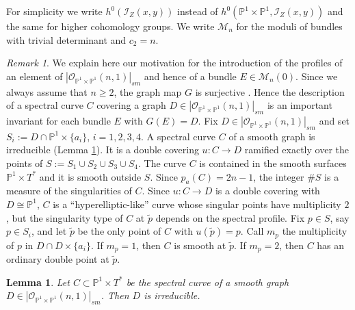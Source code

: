 \documentclass[
  a4paper, 
  reqno, 
  oneside, 
  11pt
]{amsart}
\theoremstyle{plain}	%
\newtheorem{lemma}{Lemma}
\theoremstyle{mydef} %
\theoremstyle{remark}
\newtheorem{remark}{Remark}
\theoremstyle{definition}
\theoremstyle{remark}
\begin{document}
For simplicity we write $h^0(\mathcal I_Z(x,y))$ instead of $h^0(\mathbb P^1\times \mathbb P^1,\mathcal I_Z(x,y))$ and the same for higher cohomology groups. 
We write $\mathcal M_{n}$ for the moduli of bundles 
with trivial determinant and $c_2=n$.



\begin{remark}\label{Woo1}
We explain here our motivation for the introduction of the profiles of an element of $|\mathcal O_{\mathbb P^1\times \mathbb P^1}(n,1)|_{sm}$ and hence of a bundle $E\in \mathcal M_n(0)$.
Since we always assume that $n\ge 2$, the graph map $G$ is surjective \cite[Th. 5.2.2]{BH}.
Hence the description of a spectral curve $C$  covering a graph $D\in |\mathcal O_{\mathbb P^1\times \mathbb P^1}(n,1)|_{sm}$ is an important  invariant for  each bundle $E$ with $G(E)=D$.
Fix $D\in  |\mathcal O_{\mathbb P^1\times \mathbb P^1}(n,1)|_{sm}$ and set $S_i:= D\cap \mathbb P^1\times \{a_i\}$, $i=1,2,3,4$. A spectral curve $C$ of a smooth graph is irreducible (Lemma \ref{Woo2}).
It is a double covering $u\colon C\to D$ ramified exactly over the points of $S:= S_1\cup S_2\cup S_3\cup S_4$. The curve $C$ is contained in the smooth surfaces
$\mathbb P^1\times T^*$ and it is smooth outside $S$. Since $p_a(C) =2n-1$, the integer $\#S$ is a measure of the singularities of $C$. Since $u\colon C\to D$ is a double covering with $D\cong \mathbb P^1$, 
$C$ is a ``hyperelliptic-like'' curve whose singular points have multiplicity $2$, but the singularity type of $C$ at $\tilde{p}$ depends on the spectral profile. Fix $p\in S$, say $p\in S_i$, and let $\tilde{p}$ be the only point of $C$ with $u(\tilde{p})=p$. Call $m_p$ the multiplicity of $p$ in $D\cap D\times \{a_i\}$. If $m_p=1$, then $C$ is smooth at $\tilde{p}$. If $m_p=2$, then $C$ has an ordinary double point at $\tilde{p}$.
\end{remark}

\begin{lemma}\label{Woo2}
Let $C\subset \mathbb P^1\times T^*$ be the spectral curve of a smooth graph $D\in|\mathcal O_{\mathbb P^1\times \mathbb P^1}(n,1)|_{sm}$. Then $D$ is irreducible.
\end{lemma}
\end{document}
